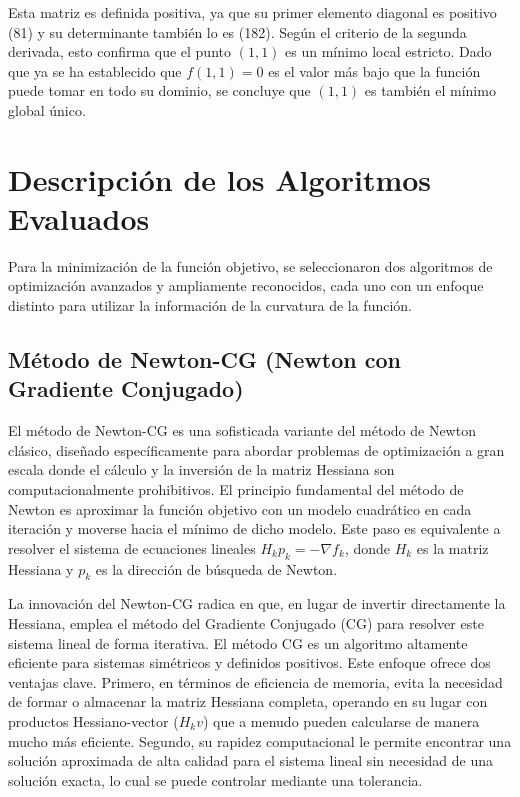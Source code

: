 \documentclass{article}
\begin{document}
Esta matriz es definida positiva, ya que su primer elemento diagonal es positivo (81) y su determinante también lo es (182). Según el criterio de la segunda derivada, esto confirma que el punto $(1, 1)$ es un mínimo local estricto. Dado que ya se ha establecido que $f(1,1)=0$ es el valor más bajo que la función puede tomar en todo su dominio, se concluye que $(1, 1)$ es también el mínimo global único.

\section{Descripción de los Algoritmos Evaluados}

Para la minimización de la función objetivo, se seleccionaron dos algoritmos de optimización avanzados y ampliamente reconocidos, cada uno con un enfoque distinto para utilizar la información de la curvatura de la función.

\subsection{Método de Newton-CG (Newton con Gradiente Conjugado)}

El método de Newton-CG es una sofisticada variante del método de Newton clásico, diseñado específicamente para abordar problemas de optimización a gran escala donde el cálculo y la inversión de la matriz Hessiana son computacionalmente prohibitivos. El principio fundamental del método de Newton es aproximar la función objetivo con un modelo cuadrático en cada iteración y moverse hacia el mínimo de dicho modelo. Este paso es equivalente a resolver el sistema de ecuaciones lineales $H_k p_k = -\nabla f_k$, donde $H_k$ es la matriz Hessiana y $p_k$ es la dirección de búsqueda de Newton.

La innovación del Newton-CG radica en que, en lugar de invertir directamente la Hessiana, emplea el método del Gradiente Conjugado (CG) para resolver este sistema lineal de forma iterativa. El método CG es un algoritmo altamente eficiente para sistemas simétricos y definidos positivos. Este enfoque ofrece dos ventajas clave. Primero, en términos de eficiencia de memoria, evita la necesidad de formar o almacenar la matriz Hessiana completa, operando en su lugar con productos Hessiano-vector ($H_k v$) que a menudo pueden calcularse de manera mucho más eficiente. Segundo, su rapidez computacional le permite encontrar una solución aproximada de alta calidad para el sistema lineal sin necesidad de una solución exacta, lo cual se puede controlar mediante una tolerancia.
\end{document}
